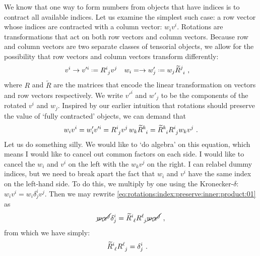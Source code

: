 \documentclass[12pt, oneside]{report}    %
\begin{document}
We know that one way to form numbers from objects that have indices is to contract all available indices. Let us examine the simplest such case: a row vector whose indices are contracted with a column vector: $w_iv^i$. Rotations are transformations that act on both row vectors and column vectors. Because row and column vectors are two separate classes of tensorial objects, we allow for the possibility that row vectors and column vectors transform differently:
\begin{align}
    v^i &\to v'^i \defeq R\aij{i}{j}v^j & w_i &= \to w'_j\defeq w_j \tilde{R}\aij{j}{i} \ ,
    \label{eq:components:of:vector:and:row:under:rotatino}
\end{align}
where $R$ and $\tilde{R}$ are the matrices that encode the linear transformation on vectors and row vectors respectively. We write $v'^i$ and $w'_j$ to be the components of the rotated $v^i$ and $w_j$. Inspired by our earlier intuition that rotations should preserve the value of `fully contracted' objects, we can demand that
\begin{align}
    w_i v^i =w'_i v'^i = R\aij{i}{j}v^j \, w_k\tilde{R}\aij{k}{i}
    =\tilde{R}\aij{k}{i}R\aij{i}{j} w_kv^j \ .
    \label{eq:rotations:index:preserve:inner:product:01}
\end{align}
Let us do something silly. We would like to `do algebra' on this equation, which means I would like to cancel out common factors on each side. I would like to cancel the $w_i$ and $v^i$ on the left with the $w_kv^j$ on the right. I can relabel dummy indices, but we need to break apart the fact that $w_i$ and $v^i$ have the same index on the left-hand side. To do this, we multiply by one using the Kronecker-$\delta$: $w_iv^i = w_i \delta^i_j v^j$. Then we may rewrite  \eqref{eq:rotations:index:preserve:inner:product:01} as
\begin{align}
    \cancel{w_i} \cancel{v^j}  \delta^i_j
    =\tilde{R}\aij{i}{\ell}R\aij{\ell}{j} \cancel{w_i} \cancel{v^j} \ ,
\end{align}
from which we have simply:
\begin{align}
    \tilde{R}\aij{i}{\ell}R\aij{\ell}{j} &= \delta^i_j \ .
    \label{eq:R:Rtilde:transformation:from:indices:rotation}
\end{align}
\end{document}
